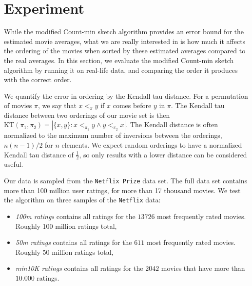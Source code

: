 \section{Experiment}
While the modified Count-min sketch algorithm provides an error bound for the
estimated movie averages, what we are really interested in is how much it
affects the ordering of the movies when sorted by these estimated averages
compared to the real averages. In this section, we evaluate the modified
Count-min sketch algorithm by running it on real-life data, and comparing the
order it produces with the correct order. 

We quantify the error in ordering by the Kendall tau distance. For a permutation
of movies $\pi$, we say that $x <_\pi y$ if $x$ comes before $y$ in $\pi$. The
Kendall tau distance between two orderings of our movie set is then $\mathrm{KT}
\left(\pi_1,\pi_2\right) = \left|\{x,y\}: x <_{\pi_1} y \wedge y <_{\pi_2}
x\right|$. The Kendall distance is often normalized to the maximum number of
inversions between the orderings, $n(n-1)/2$ for $n$ elements. We expect random
orderings to have a normalized Kendall tau distance of $\frac{1}{2}$, so
only results with a lower distance can be considered useful.

Our data is sampled from the \texttt{Netflix Prize} data set.
The full data set contains more than 100 million user ratings, for more than 17
thousand movies.
We test the algorithm on three samples of the \texttt{Netflix} data:
\begin{itemize}
	\item \textit{100m ratings} contains all ratings for the $13726$ most
		frequently rated movies. Roughly 100 million ratings total,
	\item \textit{50m ratings} contains all ratings for the $611$ most
		frequently rated movies. Roughly 50 million ratings total,
	\item \textit{min10K ratings} contains all ratings for the $2042$ movies that have more
		than $10.000$ ratings.


\end{itemize}

\pgfplotsset{scaled x ticks=false}
\begin{center}
\end{center}
